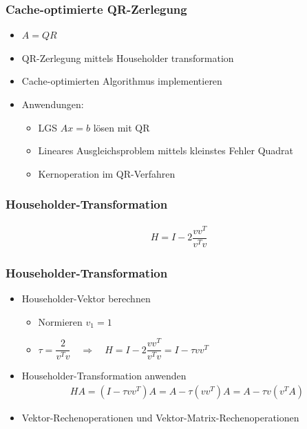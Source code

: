 \begin{frame}
\frametitle{Cache-optimierte QR-Zerlegung}
\vspace{-.6cm}
\begin{itemize}
	\item $ A = QR $
	
	\item QR-Zerlegung mittels Householder transformation
	\item Cache-optimierten Algorithmus implementieren
	\item Anwendungen:
	\begin{itemize}
		\item LGS $ Ax = b $ lösen mit QR
		\item Lineares Ausgleichsproblem mittels kleinstes Fehler Quadrat
		\item Kernoperation im QR-Verfahren
	\end{itemize}
\end{itemize}

\end{frame}

\begin{frame}
	\frametitle{Householder-Transformation}
	\vspace{-1cm}
	\begin{align*}
		H = I - 2 \dfrac{vv^T}{v^Tv}
	\end{align*}
	\centering
	\scalebox{.8}{}

\end{frame}

\begin{frame}
	\frametitle{Householder-Transformation}
	\vspace{-1cm}
	\begin{itemize}
	\item Householder-Vektor berechnen\\
		\begin{itemize}
			\item Normieren $ v_1 = 1 $
			\item $ \tau = \dfrac{2}{v^Tv} \quad \Longrightarrow \quad H = I - 2 \dfrac{vv^T}{v^Tv} = I - \tau vv^T$
		\end{itemize}
		

	\item  Householder-Transformation anwenden
		\begin{align*} 
		H A =(I - \tau vv^T) A= A - \tau (vv^T )A = A - \tau v(v^TA)
		\end{align*}
	\item  Vektor-Rechenoperationen und Vektor-Matrix-Rechenoperationen
	\end{itemize}
\end{frame}

